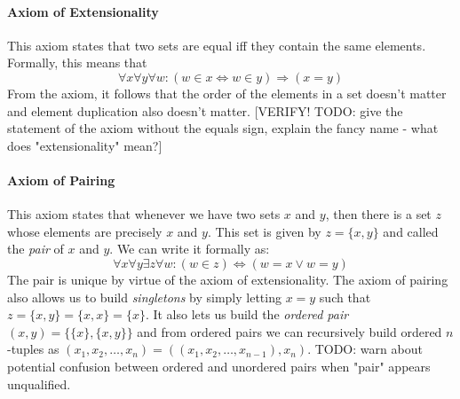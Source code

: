 
\paragraph{Axiom of Extensionality}
This axiom states that two sets are equal iff they contain the same elements. Formally, this means that
\begin{equation}
\forall x \forall y \forall w: 
(w \in x \Leftrightarrow w \in y) \Rightarrow (x = y)
\end{equation}
From the axiom, it follows that the order of the elements in a set doesn't matter and element duplication also doesn't matter. [VERIFY! TODO: give the statement of the axiom without the equals sign, explain the fancy name - what does "extensionality" mean?]



\paragraph{Axiom of Pairing}
This axiom states that whenever we have two sets $x$ and $y$, then there is a set $z$ whose elements are precisely $x$ and $y$. This set is given by $z = \{x, y\}$ and called the \emph{pair} of $x$ and $y$. We can write it formally as:
\begin{equation}
\forall x \forall y \exists z \forall w: (w \in z) \Leftrightarrow (w = x \vee w = y)
\end{equation}
The pair is unique by virtue of the axiom of extensionality. The axiom of pairing also allows us to build \emph{singletons} by simply letting $x = y$ such that  $z = \{x, y\} = \{x, x\} = \{x\}$. It also lets us build the \emph{ordered pair} $(x,y) = \{ \{x\}, \{x, y\} \}$ and from ordered pairs we can recursively build ordered $n$-tuples as $(x_1, x_2, \ldots, x_n) = ((x_1, x_2, \ldots, x_{n-1}), x_n)$. TODO: warn about potential confusion between ordered and unordered pairs when "pair" appears unqualified.


